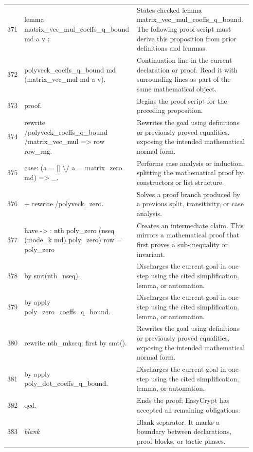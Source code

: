 \documentclass[10pt]{article}
\begin{document}
\begin{longtable}{r L{0.53\textwidth} L{0.37\textwidth}}
371 & {\ttfamily\scriptsize lemma matrix\_vec\_mul\_coeffs\_q\_bound md a v :} & States checked lemma matrix\_vec\_mul\_coeffs\_q\_bound.  The following proof script must derive this proposition from prior definitions and lemmas. \\
372 & {\ttfamily\scriptsize   polyveck\_coeffs\_q\_bound md (matrix\_vec\_mul md a v).} & Continuation line in the current declaration or proof.  Read it with surrounding lines as part of the same mathematical object. \\
373 & {\ttfamily\scriptsize proof.} & Begins the proof script for the preceding proposition. \\
374 & {\ttfamily\scriptsize rewrite /polyveck\_coeffs\_q\_bound /matrix\_vec\_mul => row row\_rng.} & Rewrites the goal using definitions or previously proved equalities, exposing the intended mathematical normal form. \\
375 & {\ttfamily\scriptsize case: (a = [] \textbackslash{}/ a = matrix\_zero md) => \_.} & Performs case analysis or induction, splitting the mathematical proof by constructors or list structure. \\
376 & {\ttfamily\scriptsize + rewrite /polyveck\_zero.} & Solves a proof branch produced by a previous split, transitivity, or case analysis. \\
377 & {\ttfamily\scriptsize   have -> : nth poly\_zero (nseq (mode\_k md) poly\_zero) row = poly\_zero} & Creates an intermediate claim.  This mirrors a mathematical proof that first proves a sub-inequality or invariant. \\
378 & {\ttfamily\scriptsize     by smt(nth\_nseq).} & Discharges the current goal in one step using the cited simplification, lemma, or automation. \\
379 & {\ttfamily\scriptsize   by apply poly\_zero\_coeffs\_q\_bound.} & Discharges the current goal in one step using the cited simplification, lemma, or automation. \\
380 & {\ttfamily\scriptsize rewrite nth\_mkseq; first by smt().} & Rewrites the goal using definitions or previously proved equalities, exposing the intended mathematical normal form. \\
381 & {\ttfamily\scriptsize by apply poly\_dot\_coeffs\_q\_bound.} & Discharges the current goal in one step using the cited simplification, lemma, or automation. \\
382 & {\ttfamily\scriptsize qed.} & Ends the proof; EasyCrypt has accepted all remaining obligations. \\
383 & {\ttfamily\scriptsize \emph{blank}} & Blank separator.  It marks a boundary between declarations, proof blocks, or tactic phases. \\

\end{longtable}
\end{document}
